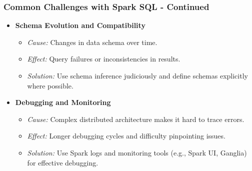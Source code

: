 \documentclass[aspectratio=169]{beamer}
\begin{document}
\begin{frame}[fragile]
    \frametitle{Common Challenges with Spark SQL - Continued}
    \begin{itemize}
        \item \textbf{Schema Evolution and Compatibility}
        \begin{itemize}
            \item \textit{Cause:} Changes in data schema over time.
            \item \textit{Effect:} Query failures or inconsistencies in results.
            \item \textit{Solution:} Use schema inference judiciously and define schemas explicitly where possible.
        \end{itemize}
        
        \item \textbf{Debugging and Monitoring}
        \begin{itemize}
            \item \textit{Cause:} Complex distributed architecture makes it hard to trace errors.
            \item \textit{Effect:} Longer debugging cycles and difficulty pinpointing issues.
            \item \textit{Solution:} Use Spark logs and monitoring tools (e.g., Spark UI, Ganglia) for effective debugging.
        \end{itemize}
    \end{itemize}
\end{frame}
\end{document}
